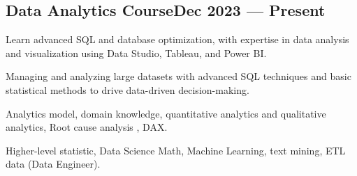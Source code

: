 \subsection{{Data Analytics Course\hfill Dec 2023 --- Present}}
\begin{zitemize}
\item Learn advanced SQL and database optimization, with expertise in data analysis and visualization using Data Studio, Tableau, and Power BI.
\item Managing and analyzing large datasets with advanced SQL techniques and basic statistical methods to drive data-driven decision-making.
\item Analytics model, domain knowledge, quantitative analytics and qualitative analytics, Root cause analysis , DAX.
\item Higher-level statistic, Data Science Math, Machine Learning, text mining, ETL data (Data Engineer).
\end{zitemize}
